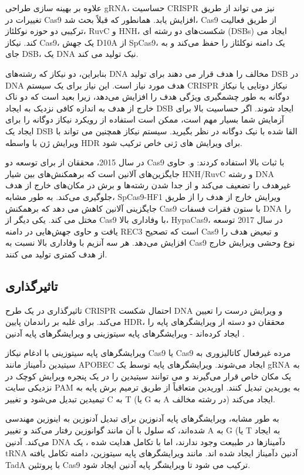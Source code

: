 \documentclass[12pt,a4paper,BCOR=.7cm,headsepline,bibliography=totoc]{report}
\begin{document}
علاوه بر بهینه سازی طراحی gRNA، حساسیت CRISPR نیز می تواند از طریق تغییرات در Cas9 افزایش یابد. همانطور که قبلاً بحث شد، Cas9 از طریق فعالیت ترکیبی دو حوزه نوکلئاز، RuvC و HNH، شکست‌های دو رشته ای (DSBs) ایجاد می کند. نیکاز Cas9، یک جهش D10A از SpCas9، یک دامنه نوکلئاز را حفظ می‌کند و به جای DSB، یک DNA نیک تولید می کند.

بنابراین، دو نیکاز که رشته‌های DNA مخالف را هدف قرار می دهند برای تولید DSB در DNA هدف مورد نیاز است. این نیاز برای یک سیستم CRISPR نیکاز دوتایی یا نیکاز دوگانه به طور چشمگیری ویژگی هدف را افزایش می‌دهد، زیرا بعید است که دو ناک خارج از هدف به اندازه کافی نزدیک به ایجاد DSB ایجاد شوند. اگر حساسیت بالا برای آزمایش شما بسیار مهم است، ممکن است استفاده از رویکرد نیکاز دوگانه را برای ایجاد یک DSB القا شده با نیک دوگانه در نظر بگیرید. سیستم نیکاز همچنین می تواند با ویرایش ژن با واسطه HDR برای ویرایش های ژنی خاص ترکیب شود.

در سال 2015، محققان از 
 برای توسعه دو Cas9 با ثبات بالا استفاده کردند:
 و.   
  حاوی جایگزین‌های آلانین است که برهمکنش‌های بین شیار HNH/RuvC و رشته DNA غیرهدف را تضعیف می‌کند و از جدا شدن رشته‌ها و برش در مکان‌های خارج از هدف جلوگیری می‌کند. به طور مشابه، SpCas9-HF1 ویرایش خارج از هدف را از طریق جایگزینی آلانین کاهش می دهد که برهمکنش Cas9 با ستون فقرات فسفات DNA را مختل می کند. یکی دیگر از Cas9 با وفاداری بالا، HypaCas9، در سال 2017 توسعه یافت و حاوی جهش‌هایی در دامنه REC3 است که تصحیح Cas9 و تبعیض هدف را افزایش می‌دهد. هر سه آنزیم با وفاداری بالا نسبت به Cas9 نوع وحشی ویرایش خارج از هدف کمتری تولید می کنند.

\subsection{تاثیرگذاری}
تاثیرگذاری در یک طرح CRISPR احتمال شکست DNA و ویرایش درست را تعیین ‌می‌کند. برای غلبه بر راندمان پایین HDR، محققان دو دسته از ویرایشگرهای پایه را ایجاد کرده‌اند - ویرایشگرهای پایه سیتوزینی  و ویرایشگرهای پایه آدنین .

ویرایشگرهای پایه سیتوزینی با ادغام نیکاز Cas9 یا Cas9 مرده غیرفعال کاتالیزوری  به سیتیدین دآمیناز مانند APOBEC ایجاد می‌شوند. ویرایشگرهای پایه توسط یک gRNA به یک مکان خاص قرار می‌گیرند و می توانند سیتیدین را در یک پنجره ویرایش کوچک در نزدیکی سایت PAM به یوریدین تبدیل کنند. اوریدین متعاقباً از طریق ترمیم برش پایه به تیمیدین تبدیل می‌شود و تغییر C به T (یا G به A در رشته مخالف) ایجاد می‌کند.

به طور مشابه، ویرایشگرهای پایه آدنوزین برای تبدیل آدنوزین به اینوزین مهندسی شده‌اند، که سلول با آن مانند گوانوزین رفتار می‌کند و تغییر A به G (یا T به  ایجاد می‌کند. آدنین DNA دآمینازها در طبیعت وجود ندارند، اما با تکامل هدایت شده ، یک tRNA آدنین دآمیناز ایجاد شده اند. مانند ویرایشگرهای پایه سیتوزین، دامنه تکامل یافته TadA با پروتئین Cas9 ترکیب می شود تا ویرایشگر پایه آدنین ایجاد شود.
\end{document}
